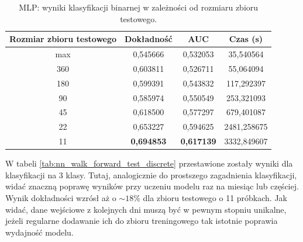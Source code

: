 \documentclass[a4paper, twoside, 11pt, openright]{article}
\begin{document}
\begin{table}[H]
    \centering
    \begin{tabular}{|c|c|c|c|}
    \hline
        \textbf{Rozmiar zbioru testowego} & \textbf{Dokładność} &  \textbf{AUC} &  \textbf{Czas (s)} \\ \hline 
max                           &  0,545666 &  0,532053 &   35,540564 \\  \hline
360                         &  0,603811 &  0,526711 &    55,064094 \\  \hline
180                         &  0,599391 &  0,543832 &   117,292397 \\  \hline
90                         &  0,585974 &  0,550549 &   253,321093 \\  \hline
45                         &  0,618500 &  0,577297 &   679,401087 \\  \hline
22                          &  0,653227 &  0,594625 &  2481,258675 \\  \hline
11                          &  \textbf{0,694853} &  \textbf{0,617139} &  3332,849607 \\ \hline
    \end{tabular}
    \caption{MLP: wyniki klasyfikacji binarnej w zależności od rozmiaru zbioru testowego.}
    \label{tab:nn_walk_forward_test_binary}
\end{table}

W tabeli \ref{tab:nn_walk_forward_test_discrete} przestawione zostały wyniki dla klasyfikacji na 3 klasy. Tutaj, analogicznie do prostszego zagadnienia klasyfikacji, widać znaczną poprawę wyników przy uczeniu modelu raz na miesiąc lub częściej. Wynik dokładności wzrósł aż o $\sim 18\%$ dla zbioru testowego o 11 próbkach. Jak widać, dane wejściowe z kolejnych dni muszą być w pewnym stopniu unikalne, jeżeli regularne dodawanie ich do zbioru treningowego tak istotnie poprawia wydajność modelu.
\end{document}
